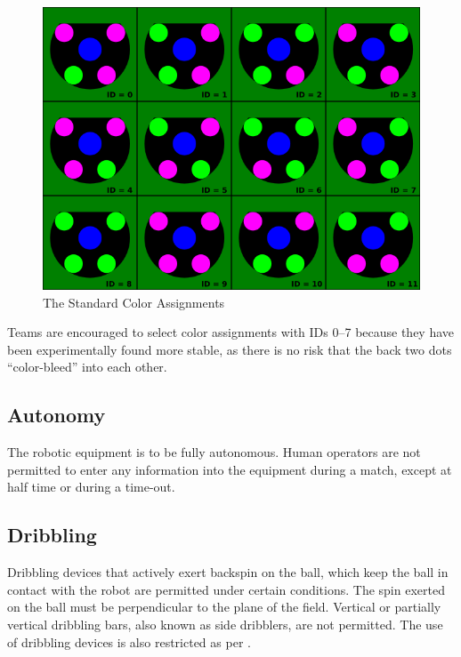 \begin{figure}[ht] %
	\centering
	\includegraphics[width=1.0\columnwidth]{img/standard_colors2010.png}
	\caption{The Standard Color Assignments}
	\label{fig:stdcolors}
\end{figure}

Teams are encouraged to select color assignments with IDs 0--7 because they have been experimentally found more stable, as there is no risk that the back two dots ``color-bleed'' into each other.

\subsection{Autonomy}
The robotic equipment is to be fully autonomous.
Human operators are not permitted to enter any information into the equipment during a match, except at half time or during a time-out.

\subsection{Dribbling}
Dribbling devices that actively exert backspin on the ball, which keep the ball in contact with the robot are permitted under certain conditions.
The spin exerted on the ball must be perpendicular to the plane of the field.
Vertical or partially vertical dribbling bars, also known as side dribblers, are not permitted.
The use of dribbling devices is also restricted as per .

